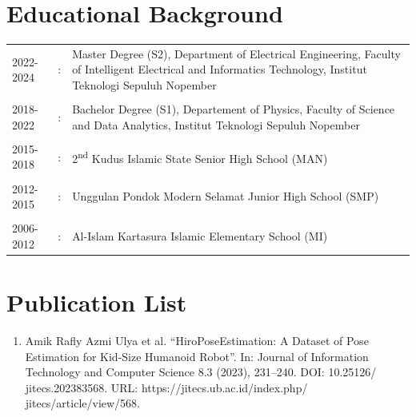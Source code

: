 \section*{Educational Background}
\begin{tabular}{p{3cm}cp{9cm}}
	2022-2024 & : &
	Master Degree (S2), Department of Electrical Engineering, Faculty of Intelligent Electrical and Informatics Technology, Institut Teknologi Sepuluh Nopember \\
	          &   &                                                                                                                                             \\
	2018-2022 & : &
	Bachelor Degree (S1), Departement of Physics, Faculty of Science and Data Analytics, Institut Teknologi Sepuluh Nopember                                    \\
	          &   &                                                                                                                                             \\
	2015-2018 & : &
	2\textsuperscript{nd} Kudus Islamic State Senior High School (MAN)                                                                                          \\
	          &   &                                                                                                                                             \\
	2012-2015 & : &
	Unggulan Pondok Modern Selamat Junior High School (SMP)                                                                                                     \\
	          &   &                                                                                                                                             \\
	2006-2012 & : &
	Al-Islam Kartasura Islamic Elementary School (MI)                                                                                                           \\
\end{tabular}


\section*{Publication List}

\begin{enumerate}
	\item Amik Rafly Azmi Ulya et al. “HiroPoseEstimation: A Dataset of Pose Estimation for Kid-Size Humanoid Robot”. In: Journal of Information Technology and Computer Science 8.3 (2023), 231–240. DOI: 10.25126/ jitecs.202383568. URL: https://jitecs.ub.ac.id/index.php/ jitecs/article/view/568.
\end{enumerate}

